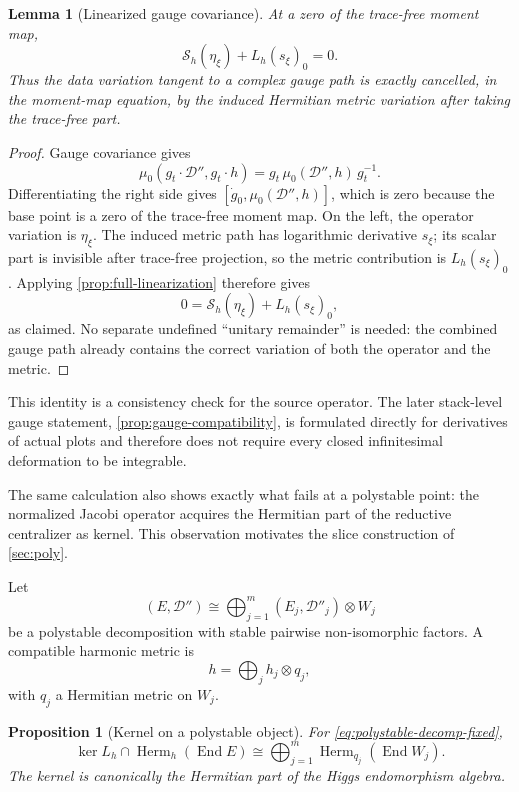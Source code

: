 \documentclass[11pt,reqno]{amsart}
\newtheorem{proposition}[theorem]{Proposition}
\newtheorem{lemma}[theorem]{Lemma}
\theoremstyle{definition}
\theoremstyle{remark}
\newcommand{\cD}{\mathcal D}
\newcommand{\cS}{\mathcal S}
\newcommand{\End}{\operatorname{End}}
\newcommand{\Herm}{\operatorname{Herm}}
\begin{document}
\begin{lemma}[Linearized gauge covariance]\label{lem:source-gauge}
At a zero of the trace-free moment map,
\begin{equation}\label{eq:source-gauge}
  \cS_h(\eta_\xi)+L_h(s_\xi)_0=0.
\end{equation}
Thus the data variation tangent to a complex gauge path is exactly cancelled, in the moment-map equation, by the induced Hermitian metric variation after taking the trace-free part.
\end{lemma}

\begin{proof}
Gauge covariance gives
\[
  \mu_0(g_t\cdot\cD'',g_t\cdot h)
  =g_t\,\mu_0(\cD'',h)\,g_t^{-1}.
\]
Differentiating the right side gives
$[\dot g_0,\mu_0(\cD'',h)]$, which is zero because the base point is a
zero of the trace-free moment map.  On the left, the operator variation
is $\eta_\xi$.  The induced metric path has logarithmic derivative
$s_\xi$; its scalar part is invisible after trace-free projection, so
the metric contribution is $L_h(s_\xi)_0$.  Applying
\cref{prop:full-linearization} therefore gives
\[
 0=\cS_h(\eta_\xi)+L_h(s_\xi)_0,
\]
as claimed.  No separate undefined ``unitary remainder'' is needed:
the combined gauge path already contains the correct variation of both
the operator and the metric.
\end{proof}

This identity is a consistency check for the source operator.  The later stack-level gauge statement, \cref{prop:gauge-compatibility}, is formulated directly for derivatives of actual plots and therefore does not require every closed infinitesimal deformation to be integrable.


The same calculation also shows exactly what fails at a polystable point: the normalized Jacobi operator acquires the Hermitian part of the reductive centralizer as kernel.  This observation motivates the slice construction of \cref{sec:poly}.


Let
\begin{equation}\label{eq:polystable-decomp-fixed}
  (E,\cD'')\cong
  \bigoplus_{j=1}^m(E_j,\cD''_j)\otimes W_j
\end{equation}
be a polystable decomposition with stable pairwise non-isomorphic factors.  A compatible harmonic metric is
\[
  h=\bigoplus_j h_j\otimes q_j,
\]
with $q_j$ a Hermitian metric on $W_j$.

\begin{proposition}[Kernel on a polystable object]\label{prop:poly-kernel}
For \eqref{eq:polystable-decomp-fixed},
\begin{equation}\label{eq:poly-kernel}
  \ker L_h\cap\Herm_h(\End E)
  \cong
  \bigoplus_{j=1}^m\Herm_{q_j}(\End W_j).
\end{equation}
The kernel is canonically the Hermitian part of the Higgs endomorphism algebra.
\end{proposition}
\end{document}
